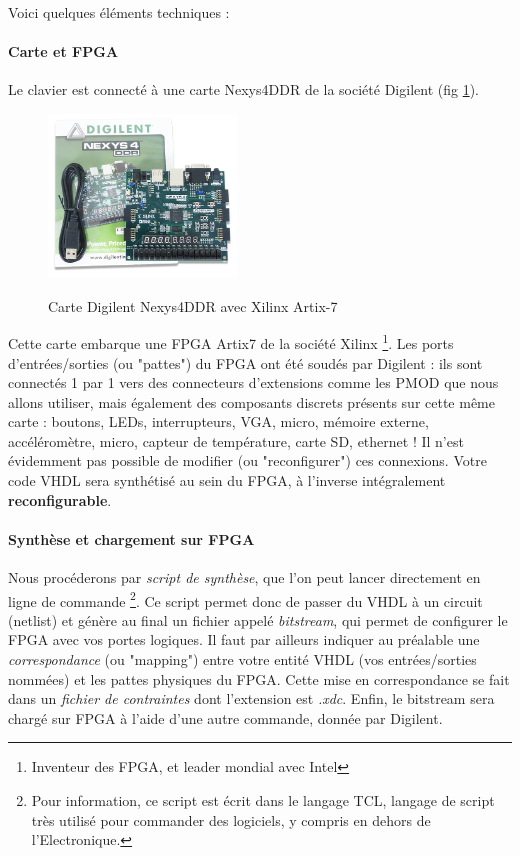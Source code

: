 \documentclass[a4paper,11pt]{article}
\begin{document}
Voici quelques éléments techniques :

\paragraph{Carte et FPGA}
Le clavier est connecté à une carte Nexys4DDR de la société Digilent (fig \ref{nexys4ddr}).
\begin{figure}
  \centering
  \includegraphics[width=5cm]{./figures/nexys4ddr.png}
  \label{nexys4ddr}
  \caption{Carte Digilent Nexys4DDR avec Xilinx Artix-7}
\end{figure}

Cette carte embarque une FPGA Artix7 de la société Xilinx \footnote{Inventeur des FPGA, et leader mondial avec Intel}.
Les ports d'entrées/sorties (ou "pattes") du FPGA ont été soudés par Digilent : ils sont connectés 1 par 1 vers des connecteurs d'extensions comme les PMOD que nous allons utiliser, mais également des
composants discrets présents sur cette même carte :
boutons, LEDs, interrupteurs, VGA, micro, mémoire externe, accéléromètre,
 micro, capteur de température, carte SD, ethernet ! Il n'est évidemment pas possible de modifier (ou "reconfigurer") ces connexions.
Votre code VHDL sera synthétisé au sein du FPGA, à l'inverse intégralement \textbf{reconfigurable}.

\paragraph{Synthèse et chargement sur FPGA}

Nous procéderons par \textit{script de synthèse}, que l'on peut lancer directement
en ligne de commande \footnote{Pour information, ce script est écrit dans le langage TCL, langage de script très utilisé pour commander des logiciels, y compris en dehors de l'Electronique.}.
Ce script permet donc de passer du VHDL à un circuit (netlist) et génère au final un fichier appelé \textit{bitstream}, qui permet de configurer le FPGA avec vos portes logiques.
Il faut par ailleurs indiquer au préalable une \textit{correspondance} (ou "mapping") entre votre entité VHDL (vos entrées/sorties nommées)
et les pattes physiques du FPGA. Cette mise en correspondance se fait dans un \textit{fichier de contraintes} dont l'extension est {\it .xdc}. Enfin, le bitstream sera chargé sur FPGA à l'aide d'une autre commande, donnée par Digilent.
\end{document}
